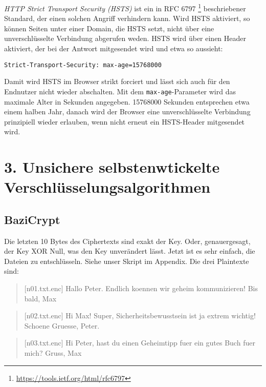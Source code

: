 \documentclass[10pt,a4paper]{article}
\begin{document}
        \textit{HTTP Strict Transport Security (HSTS)} ist ein in RFC 6797%
        \footnote{\url{https://tools.ietf.org/html/rfc6797}} beschriebener
        Standard, der einen solchen Angriff verhindern kann. Wird HSTS aktiviert,
        so können Seiten unter einer Domain, die HSTS setzt, nicht über eine
        unverschlüsselte Verbindung abgerufen weden.
        HSTS wird über einen Header aktiviert, der bei der Antwort mitgesendet
        wird und etwa so aussieht:

        \begin{verbatim}
Strict-Transport-Security: max-age=15768000
        \end{verbatim}

        Damit wird HSTS im Browser strikt forciert und lässt sich auch für
        den Endnutzer nicht wieder abschalten.
        Mit dem \texttt{max-age}-Parameter wird das maximale Alter
        in Sekunden angegeben. 15768000 Sekunden entsprechen etwa einem halben
        Jahr, danach wird der Browser eine unverschlüsselte Verbindung prinzipiell
        wieder erlauben, wenn nicht erneut ein HSTS-Header mitgesendet wird.

\setcounter{section}{3}
\section*{3. Unsichere selbstenwtickelte Verschlüsselungsalgorithmen}
\setcounter{subsection}{0}
\subsection{BaziCrypt}
Die letzten 10 Bytes des Ciphertexts sind exakt der Key. Oder, genauergesagt, der Key XOR Null,
was den Key unverändert lässt. Jetzt ist es sehr einfach, die Dateien zu entschlüsseln. Siehe
unser Skript im Appendix. Die drei Plaintexte sind:
\begin{quote}[n01.txt.enc]
Hallo Peter. Endlich koennen wir geheim kommunizieren! Bis bald, Max
\end{quote}
\begin{quote}[n02.txt.enc]
Hi Max! Super, Sicherheitsbewusstsein ist ja extrem wichtig! Schoene Gruesse, Peter.
\end{quote}
\begin{quote}[n03.txt.enc]
Hi Peter, hast du einen Geheimtipp fuer ein gutes Buch fuer mich? Gruss, Max
\end{quote}
\end{document}
